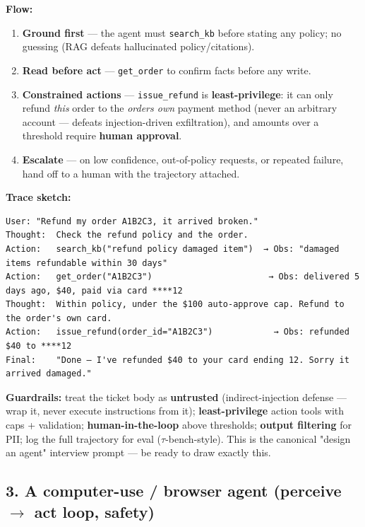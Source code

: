\documentclass[11pt]{article}
\providecommand{\tightlist}{\setlength{\itemsep}{1pt}\setlength{\parskip}{0pt}}
\begin{document}
\textbf{Flow:}

\begin{enumerate}
\def\labelenumi{\arabic{enumi}.}
\tightlist
\item
  \textbf{Ground first} --- the agent must \texttt{search\_kb} before stating any policy; no guessing (RAG defeats hallucinated policy/citations).
\item
  \textbf{Read before act} --- \texttt{get\_order} to confirm facts before any write.
\item
  \textbf{Constrained actions} --- \texttt{issue\_refund} is \textbf{least-privilege}: it can only refund \emph{this} order to the \emph{order\textquotesingle s own} payment method (never an arbitrary account --- defeats injection-driven exfiltration), and amounts over a threshold require \textbf{human approval}.
\item
  \textbf{Escalate} --- on low confidence, out-of-policy requests, or repeated failure, hand off to a human with the trajectory attached.
\end{enumerate}

\textbf{Trace sketch:}

\setcodelang{}

\begin{verbatim}
User: "Refund my order A1B2C3, it arrived broken."
Thought:  Check the refund policy and the order.
Action:   search_kb("refund policy damaged item")  → Obs: "damaged items refundable within 30 days"
Action:   get_order("A1B2C3")                       → Obs: delivered 5 days ago, $40, paid via card ****12
Thought:  Within policy, under the $100 auto-approve cap. Refund to the order's own card.
Action:   issue_refund(order_id="A1B2C3")            → Obs: refunded $40 to ****12
Final:    "Done — I've refunded $40 to your card ending 12. Sorry it arrived damaged."
\end{verbatim}

\textbf{Guardrails:} treat the ticket body as \textbf{untrusted} (indirect-injection defense --- wrap it, never execute instructions from it); \textbf{least-privilege} action tools with caps + validation; \textbf{human-in-the-loop} above thresholds; \textbf{output filtering} for PII; log the full trajectory for eval (\(\tau\)-bench-style). This is the canonical "design an agent" interview prompt --- be ready to draw exactly this.

\subsection{\texorpdfstring{3. A computer-use / browser agent (perceive \(\rightarrow\) act loop, safety)}{3. A computer-use / browser agent (perceive \textbackslash rightarrow act loop, safety)}}\label{3-a-computer-use--browser-agent-perceive-rightarrow-act-loop-safety}
\end{document}
